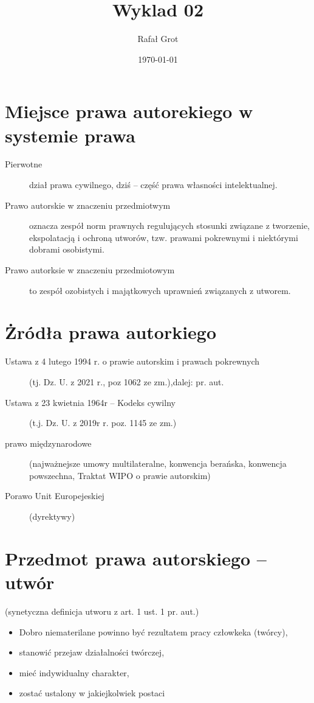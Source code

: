 \documentclass[11pt]{article}
\author{Rafał Grot}
\date{\today}
\title{Wyklad 02}
\begin{document}
\maketitle
\tableofcontents

\section{Miejsce prawa autorekiego w systemie prawa}
\label{sec:org4b9256c}
\begin{description}
\item[{Pierwotne}] dział prawa cywilnego, dziś -- część prawa własności intelektualnej.
\item[{Prawo autorskie w znaczeniu przedmiotwym}] oznacza zespół norm prawnych regulujących stosunki związane z tworzenie, ekspolatacją i ochroną utworów, tzw. prawami pokrewnymi i niektórymi dobrami osobistymi.
\item[{Prawo autorksie w znaczeniu przedmiotowym}] to zespół ozobistych i majątkowych uprawnień związanych z utworem.
\end{description}
\section{Żródła prawa autorkiego}
\label{sec:org77d77c7}
\begin{description}
\item[{Ustawa z 4 lutego 1994 r. o prawie autorskim i prawach pokrewnych}] (tj. Dz. U. z 2021 r., poz 1062 ze zm.),dalej: pr. aut.
\item[{Ustawa z 23 kwietnia 1964r -- Kodeks cywilny}] (t.j. Dz. U. z 2019r r. poz. 1145 ze zm.)
\item[{prawo międzynarodowe}] (najważnejsze umowy multilateralne, konwencja berańska, konwencja powszechna, Traktat WIPO o prawie autorskim)
\item[{Porawo Unit Europejeskiej}] (dyrektywy)
\end{description}
\section{Przedmot prawa autorskiego -- utwór}
\label{sec:org39fe1da}
(synetyczna definicja utworu z art. 1 ust. 1 pr. aut.)
\begin{itemize}
\item Dobro niematerilane powinno być rezultatem pracy człowkeka (twórcy),
\item stanowić przejaw działalności twórczej,
\item mieć indywidualny charakter,
\item zostać ustalony w jakiejkolwiek postaci
\end{itemize}
\end{document}

